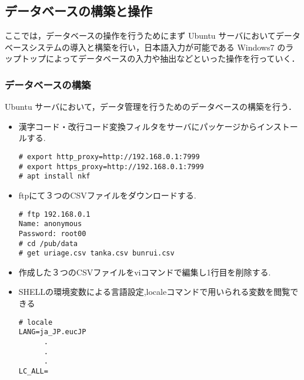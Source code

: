 \documentclass[a4j,titlepage]{jarticle}
\begin{document}
\subsection{データベースの構築と操作}
ここでは，データベースの操作を行うためにまず Ubuntu サーバにおいてデータベースシステムの導入と構築を行い，日本語入力が可能である Windows7 のラップトップによってデータベースの入力や抽出などといった操作を行っていく．


\subsubsection{データベースの構築}
Ubuntu サーバにおいて，データ管理を行うためのデータベースの構築を行う．
\begin{itemize}
  \item 漢字コード・改行コード変換フィルタをサーバにパッケージからインストールする.\\
\begin{screen}
    \begin{center}
\begin{verbatim}
# export http_proxy=http://192.168.0.1:7999
# export https_proxy=http://192.168.0.1:7999
# apt install nkf
\end{verbatim}
    \end{center}
  \end{screen}

\item ftpにて３つのCSVファイルをダウンロードする.\\
  \begin{screen}
    \begin{center}
\begin{verbatim}
# ftp 192.168.0.1
Name: anonymous
Password: root00
# cd /pub/data
# get uriage.csv tanka.csv bunrui.csv
\end{verbatim}
    \end{center}
  \end{screen}

\item 作成した３つのCSVファイルをviコマンドで編集し1行目を削除する.\\

\item SHELLの環境変数による言語設定,localeコマンドで用いられる変数を閲覧できる\\
   \begin{screen}
    \begin{center}
\begin{verbatim}
# locale
LANG=ja_JP.eucJP
      .
      .
      .
LC_ALL=
\end{verbatim}
    \end{center}
  \end{screen}


\end{itemize}
\end{document}
